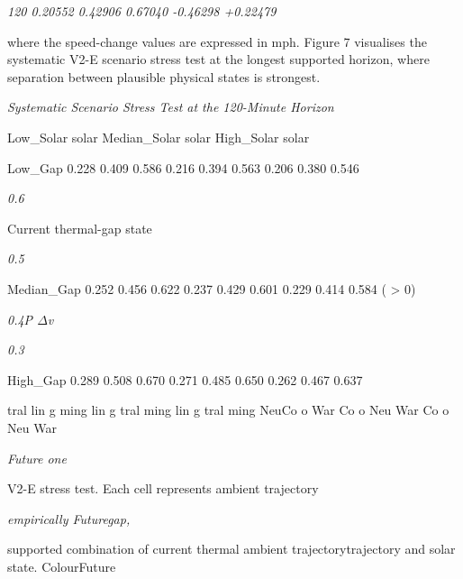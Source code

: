 \begin{center}\textit{120    0.20552   0.42906         0.67040 -0.46298                             +0.22479}\end{center}

where the speed-change values are expressed in mph. Figure 7 visualises the systematic V2-E scenario stress test at the longest supported horizon, where separation between plausible physical states is strongest.

\begin{center}\textit{Systematic Scenario Stress Test at the 120-Minute Horizon}\end{center}

Low\_Solar solar Median\_Solar solar High\_Solar solar

Low\_Gap 0.228 0.409 0.586 0.216 0.394 0.563 0.206 0.380 0.546

\begin{center}\textit{0.6}\end{center}

Current thermal-gap state

\begin{center}\textit{0.5}\end{center}

Median\_Gap 0.252 0.456 0.622 0.237 0.429 0.601 0.229 0.414 0.584 ( > 0)

\begin{center}\textit{0.4P \ensuremath{\Delta}v}\end{center}

\begin{center}\textit{0.3}\end{center}

High\_Gap 0.289 0.508 0.670 0.271 0.485 0.650 0.262 0.467 0.637

tral lin g ming lin g tral ming lin g tral ming NeuCo o War Co o Neu War Co o Neu War

\begin{center}\textit{Future one}\end{center}

V2-E stress test. Each cell represents ambient trajectory

\begin{center}\textit{empirically                                    Futuregap,}\end{center}

supported combination of current thermal ambient trajectorytrajectory and solar state. ColourFuture

